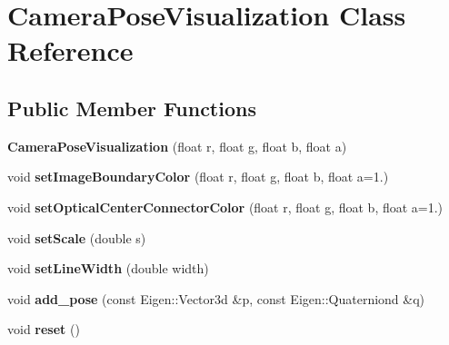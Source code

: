 \hypertarget{classCameraPoseVisualization}{}\section{Camera\+Pose\+Visualization Class Reference}
\label{classCameraPoseVisualization}
\subsection*{Public Member Functions}
\begin{DoxyCompactItemize}
\item 
\mbox{\label{classCameraPoseVisualization_ab0900a96947ea4a31603c99253d3e8a2}} 
{\bfseries Camera\+Pose\+Visualization} (float r, float g, float b, float a)
\item 
\mbox{\label{classCameraPoseVisualization_ad0077b4ae7856a219648e698b0e19583}} 
void {\bfseries set\+Image\+Boundary\+Color} (float r, float g, float b, float a=1.)
\item 
\mbox{\label{classCameraPoseVisualization_a97ba9b67388cbec777ba699cb9b16b60}} 
void {\bfseries set\+Optical\+Center\+Connector\+Color} (float r, float g, float b, float a=1.)
\item 
\mbox{\label{classCameraPoseVisualization_ad80a8caac209f5c8152a11d76a7bdb13}} 
void {\bfseries set\+Scale} (double s)
\item 
\mbox{\label{classCameraPoseVisualization_aaff71a7169d94c3430b2720be940e34f}} 
void {\bfseries set\+Line\+Width} (double width)
\item 
\mbox{\label{classCameraPoseVisualization_acd8c3319206d898250db48154bd4712b}} 
void {\bfseries add\+\_\+pose} (const Eigen\+::\+Vector3d \&p, const Eigen\+::\+Quaterniond \&q)
\item 
\mbox{\label{classCameraPoseVisualization_a0a6a3843b6c43675ee8d3862b274394a}} 
void {\bfseries reset} ()
\item 
\mbox{\label{classCameraPoseVisualization_af622cbb53e629b09a19dcd0396ce0c1d}} 

\end{DoxyCompactItemize}
